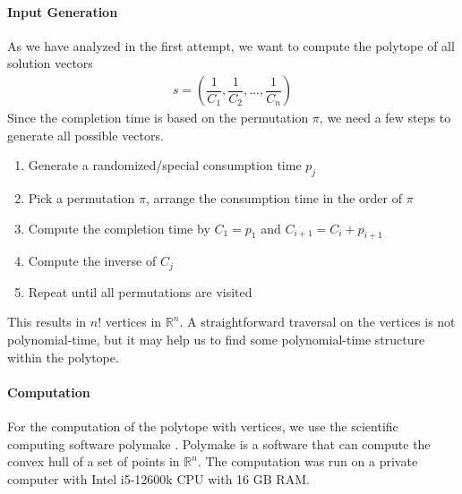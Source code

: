\documentclass[12pt,letterpaper]{article}
\newcommand*{\R}{\mathbb{R}}
\begin{document}
\paragraph{Input Generation}
As we have analyzed in the first attempt, we want to compute the polytope of all solution vectors 
\begin{align*}
 s = \left( \dfrac{1}{C_1}, \dfrac{1}{C_2}, ..., \dfrac{1}{C_n} \right)
\end{align*}
Since the completion time is based on the permutation $\pi$, we need a few steps to generate all possible 
vectors. 
\begin{enumerate}
    \item Generate a randomized/special consumption time $p_j$
    \item Pick a permutation $\pi$, arrange the consumption time in the order of $\pi$
    \item Compute the completion time by $C_1 = p_1$ and $C_{i+1} = C_i + p_{i+1}$
    \item Compute the inverse of $C_j$
    \item Repeat until all permutations are visited
\end{enumerate}
This results in $n!$ vertices in $\R^n$. A straightforward traversal on the vertices is not 
polynomial-time, but it may help us to find some polynomial-time structure within the polytope.

\paragraph{Computation}
For the computation of the polytope with vertices, we use the scientific computing software polymake \cite{assarf2017computing}.
Polymake is a software that can compute the convex hull of a set of points in $\R^n$. 
The computation was run on a private computer with Intel i5-12600k CPU with 16 GB RAM. 
\end{document}
